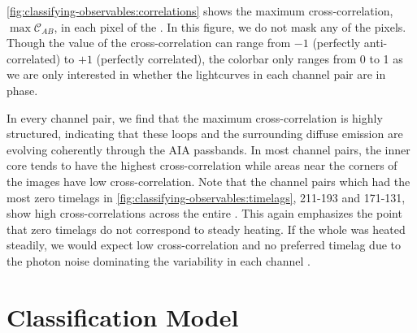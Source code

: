\autoref{fig:classifying-observables:correlations} shows the maximum cross-correlation, $\max\mathcal{C}_{AB}$, in each pixel of the \AR{}. In this figure, we do not mask any of the pixels. Though the value of the cross-correlation can range from $-1$ (perfectly anti-correlated) to $+1$ (perfectly correlated), the colorbar only ranges from 0 to 1 as we are only interested in whether the lightcurves in each channel pair are in phase.

In every channel pair, we find that the maximum cross-correlation is highly structured, indicating that these loops and the surrounding diffuse emission are evolving coherently through the AIA passbands. In most channel pairs, the inner core tends to have the highest cross-correlation while areas near the corners of the images have low cross-correlation. Note that the channel pairs which had the most zero timelags in \autoref{fig:classifying-observables:timelags}, 211-193 and 171-131, show high cross-correlations across the entire \AR{}. This again emphasizes the point that zero timelags do not correspond to steady heating. If the whole \AR{} was heated steadily, we would expect low cross-correlation and no preferred timelag due to the photon noise dominating the variability in each channel \citep{viall_signatures_2016}.

\section{Classification Model}\label{sec:classifying-observables:compare}

